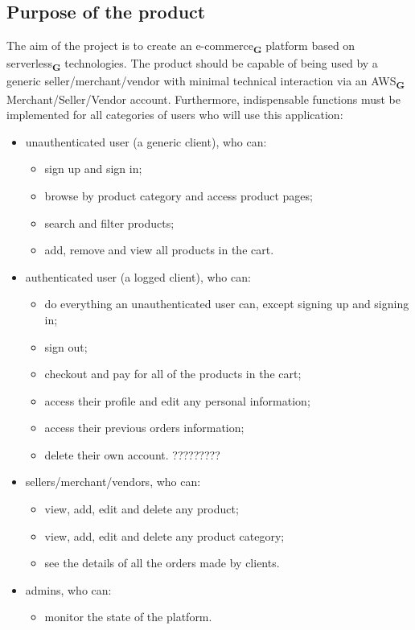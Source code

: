 \subsection{Purpose of the product}
The aim of the project is to create an e-commerce\textsubscript{\textbf{G}} platform based on serverless\textsubscript{\textbf{G}} technologies.
The product should be capable of being used by a generic seller/merchant/vendor with minimal technical interaction
via an AWS\textsubscript{\textbf{G}} Merchant/Seller/Vendor account.
Furthermore, indispensable functions must be implemented for all categories of users who will use this application:
\begin{itemize}
    \item unauthenticated user (a generic client), who can:
          \begin{itemize}
              \item sign up and sign in;
              \item browse by product category and access product pages;
              \item search and filter products;
              \item add, remove and view all products in the cart.
          \end{itemize}
    \item authenticated user (a logged client), who can:
          \begin{itemize}
              \item do everything an unauthenticated user can, except signing up and signing in;
              \item sign out;
              \item checkout and pay for all of the products in the cart;
              \item access their profile and edit any personal information;
              \item access their previous orders information;
              \item delete their own account. ?????????
          \end{itemize}
    \item sellers/merchant/vendors, who can:
          \begin{itemize}
              \item view, add, edit and delete any product;
              \item view, add, edit and delete any product category;
              \item see the details of all the orders made by clients.
          \end{itemize}
    \item admins, who can:
          \begin{itemize}
              \item monitor the state of the platform.
          \end{itemize}
\end{itemize}
